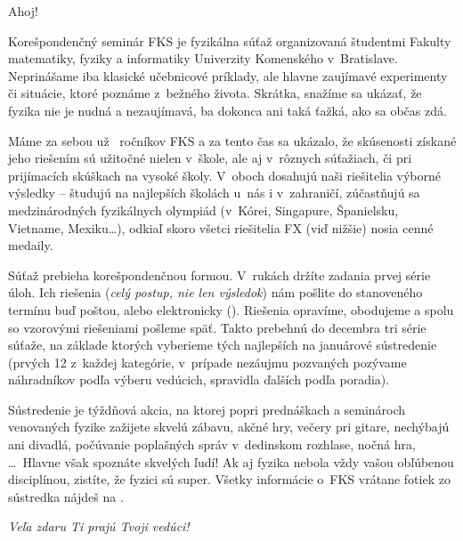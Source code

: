 Ahoj!

Korešpondenčný seminár FKS je fyzikálna súťaž organizovaná študentmi Fakulty
matematiky, fyziky a informatiky Univerzity Komenského v~Bratislave. Neprinášame
iba klasické učebnicové príklady, ale hlavne zaujímavé experimenty či situácie,
ktoré poznáme z~bežného života. Skrátka, snažíme sa ukázať, že fyzika nie je
nudná a nezaujímavá, ba dokonca ani taká ťažká, ako sa občas zdá.

Máme za sebou už \the\numexpr{}\relax\ ročníkov FKS a za tento čas sa ukázalo, že skúsenosti
získané jeho riešením sú užitočné nielen v~škole, ale aj v~rôznych súťažiach, či
pri prijímacích skúškach na vysoké školy. V~oboch dosahujú naši riešitelia
výborné výsledky -- študujú na najlepších školách u~nás i v~zahraničí,
zúčastňujú sa medzinárodných fyzikálnych olympiád (v~Kórei, Singapure,
Španielsku, Vietname, Mexiku\dots), odkiaľ skoro všetci riešitelia FX (viď nižšie)
nosia cenné medaily.

Súťaž prebieha korešpondenčnou formou. V~rukách držíte zadania prvej série úloh.
Ich riešenia (\emph{celý postup, nie len výsledok}) nám pošlite do stanoveného termínu
buď poštou, alebo elektronicky (\URL{\seminarSubmitURL}). Riešenia opravíme,
obodujeme a spolu so vzorovými riešeniami pošleme späť. Takto prebehnú do
decembra tri série súťaže, na základe ktorých vyberieme tých najlepších na
januárové sústredenie (prvých 12 z~každej kategórie, v~prípade nezáujmu
pozvaných pozývame náhradníkov podľa výberu vedúcich, spravidla ďalších podľa
poradia).

Sústredenie je týždňová akcia, na ktorej popri prednáškach a seminároch
venovaných fyzike zažijete skvelú zábavu, akčné hry, večery pri gitare,
nechýbajú ani divadlá, počúvanie poplašných správ v~dedinskom rozhlase, nočná
hra, \dots\ Hlavne však spoznáte skvelých ľudí! Ak aj fyzika nebola vždy vašou
obľúbenou disciplínou, zistíte, že fyzici sú super.  Všetky informácie o~FKS
vrátane fotiek zo sústredka nájdeš na \URL{\seminarURL}.

\hfill \emph{Veľa zdaru Ti prajú Tvoji vedúci!}%
